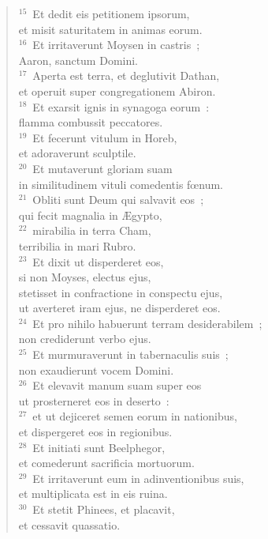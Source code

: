 \begin{flushleft}
\begin{verse}
${}^{15}$~Et dedit eis petitionem ipsorum,\\ et misit saturitatem in animas eorum.\\
${}^{16}$~Et irritaverunt Moysen in castris~;\\ Aaron, sanctum Domini.\\
${}^{17}$~Aperta est terra, et deglutivit Dathan,\\ et operuit super congregationem Abiron.\\
${}^{18}$~Et exarsit ignis in synagoga eorum~:\\ flamma combussit peccatores.\\
${}^{19}$~Et fecerunt vitulum in Horeb,\\ et adoraverunt sculptile.\\
${}^{20}$~Et mutaverunt gloriam suam\\ in similitudinem vituli comedentis fœnum.\\
${}^{21}$~Obliti sunt Deum qui salvavit eos~;\\ qui fecit magnalia in \AE gypto,\\
${}^{22}$~mirabilia in terra Cham,\\ terribilia in mari Rubro.\\
${}^{23}$~Et dixit ut disperderet eos,\\ si non Moyses, electus ejus,\\ stetisset in confractione in conspectu ejus,\\ ut averteret iram ejus, ne disperderet eos.\\
${}^{24}$~Et pro nihilo habuerunt terram desiderabilem~;\\ non crediderunt verbo ejus.\\
${}^{25}$~Et murmuraverunt in tabernaculis suis~;\\ non exaudierunt vocem Domini.\\
${}^{26}$~Et elevavit manum suam super eos\\ ut prosterneret eos in deserto~:\\
${}^{27}$~et ut dejiceret semen eorum in nationibus,\\ et dispergeret eos in regionibus.\\
${}^{28}$~Et initiati sunt Beelphegor,\\ et comederunt sacrificia mortuorum.\\
${}^{29}$~Et irritaverunt eum in adinventionibus suis,\\ et multiplicata est in eis ruina.\\
${}^{30}$~Et stetit Phinees, et placavit,\\ et cessavit quassatio.\\

\end{verse}
\end{flushleft}
